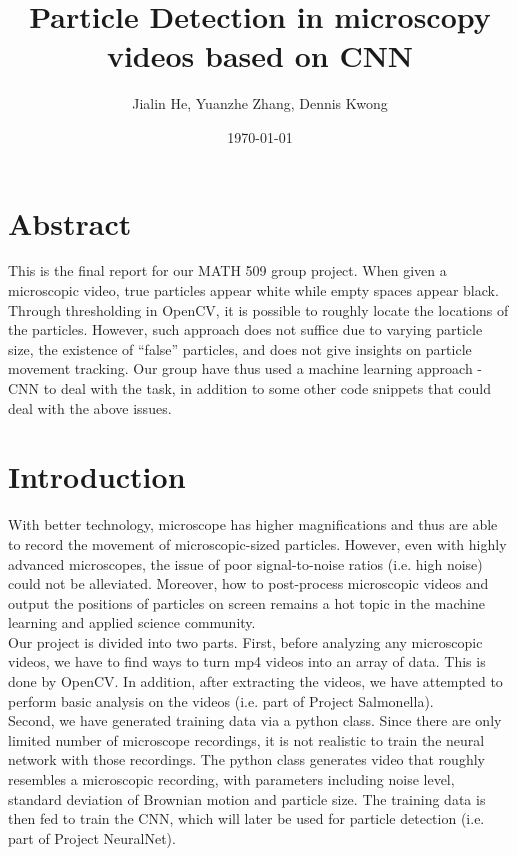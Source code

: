 \documentclass[11pt,a4paper]{scrartcl}
\begin{document}
%
\title{Particle Detection in microscopy videos based on CNN}
\author{Jialin He, Yuanzhe Zhang, Dennis Kwong}
\date{\today}
\maketitle
\renewcommand\abstractname{Abstract}
\section*{\abstractname}
This is the final report for our MATH 509 group project. When given a microscopic video, true particles appear white while empty spaces appear black. Through thresholding in OpenCV, it is possible to roughly locate the locations of the particles. However, such approach does not suffice due to varying particle size, the existence of ``false'' particles, and does not give insights on particle movement tracking. Our group have thus used a machine learning approach - CNN to deal with the task, in addition to some other code snippets that could deal with the above issues.

\thispagestyle{empty}
\tableofcontents
\thispagestyle{empty}
\cleardoublepage
{} 
\newpage


\section{Introduction}
With better technology, microscope has higher magnifications and thus are able to record the movement of microscopic-sized particles. However, even with highly advanced microscopes, the issue of poor signal-to-noise ratios (i.e. high noise) could not be alleviated. Moreover, how to post-process microscopic videos and output the positions of particles on screen remains a hot topic in the machine learning and applied science community.\\

Our project is divided into two parts. First, before analyzing any microscopic videos, we have to find ways to turn mp4 videos into an array of data. This is done by OpenCV. In addition, after extracting the videos, we have attempted to perform basic analysis on the videos (i.e. part of Project Salmonella).\\

Second, we have generated training data via a python class. Since there are only limited number of microscope recordings, it is not realistic to train the neural network with those recordings. The python class generates video that roughly resembles a microscopic recording, with parameters including noise level, standard deviation of Brownian motion and particle size. The training data is then fed to train the CNN, which will later be used for particle detection (i.e. part of Project NeuralNet).
\end{document}
